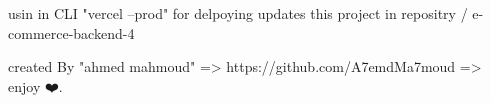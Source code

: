 usin in CLI "vercel --prod" for delpoying updates
this project in repositry / e-commerce-backend-4

created By "ahmed mahmoud"
=> https://github.com/A7emdMa7moud
=> enjoy ❤️.